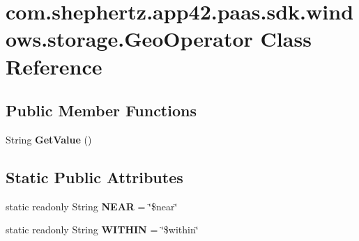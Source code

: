 \hypertarget{classcom_1_1shephertz_1_1app42_1_1paas_1_1sdk_1_1windows_1_1storage_1_1_geo_operator}{\section{com.\+shephertz.\+app42.\+paas.\+sdk.\+windows.\+storage.\+Geo\+Operator Class Reference}
\label{classcom_1_1shephertz_1_1app42_1_1paas_1_1sdk_1_1windows_1_1storage_1_1_geo_operator}
}
\subsection*{Public Member Functions}
\begin{DoxyCompactItemize}
\item 
\hypertarget{classcom_1_1shephertz_1_1app42_1_1paas_1_1sdk_1_1windows_1_1storage_1_1_geo_operator_a1a465ac9b26527cc580f3038f320b1fa}{String {\bfseries Get\+Value} ()}\label{classcom_1_1shephertz_1_1app42_1_1paas_1_1sdk_1_1windows_1_1storage_1_1_geo_operator_a1a465ac9b26527cc580f3038f320b1fa}

\end{DoxyCompactItemize}
\subsection*{Static Public Attributes}
\begin{DoxyCompactItemize}
\item 
\hypertarget{classcom_1_1shephertz_1_1app42_1_1paas_1_1sdk_1_1windows_1_1storage_1_1_geo_operator_ac9251531d2ff652a5cb8679f62cdb524}{static readonly String {\bfseries N\+E\+A\+R} = \char`\"{}\$near\char`\"{}}\label{classcom_1_1shephertz_1_1app42_1_1paas_1_1sdk_1_1windows_1_1storage_1_1_geo_operator_ac9251531d2ff652a5cb8679f62cdb524}

\item 
\hypertarget{classcom_1_1shephertz_1_1app42_1_1paas_1_1sdk_1_1windows_1_1storage_1_1_geo_operator_a86be9c97854c8bbe9dbc2b5471f9a6f2}{static readonly String {\bfseries W\+I\+T\+H\+I\+N} = \char`\"{}\$within\char`\"{}}\label{classcom_1_1shephertz_1_1app42_1_1paas_1_1sdk_1_1windows_1_1storage_1_1_geo_operator_a86be9c97854c8bbe9dbc2b5471f9a6f2}

\end{DoxyCompactItemize}
